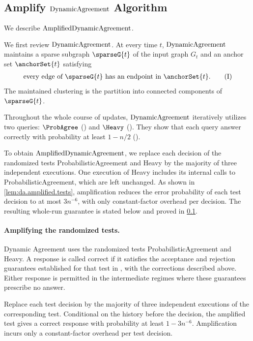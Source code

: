 \subsection{Amplify \texorpdfstring{$ \mathrm{DynamicAgreement} $}{DynamicAgreement} Algorithm}
\label{sub:amplify.da}
We describe $ \mathrm{AmplifiedDynamicAgreement} $.

We first review $ \mathrm{DynamicAgreement} $.
At every time $ t $, $ \mathrm{DynamicAgreement} $ maintains a sparse subgraph $ \sparseG{t} $ of the input graph $ G_t $ and an anchor set $ \anchorSet{t} $ satisfying
\begin{align}
    \text{every edge of } \sparseG{t} \text{ has an endpoint in } \anchorSet{t}. \tag{I} \label{eq:invariant.anchor}
\end{align}
The maintained clustering is the partition into connected components of $ \sparseG{t} $.

Throughout the whole course of updates, $ \mathrm{DynamicAgreement} $ iteratively utilizes two queries: $ \ProbAgree$ (\cite[Algorithm 8]{CLMP2024Dynamic}) and $ \Heavy $ (\cite[Algorithm 9]{CLMP2024Dynamic}).
They show that each query answer correctly with probability at least $ 1-n/2 $ (\cite[Lemma 49, Lemma 50, Lemma 52, Lemma 53]{CLMP2024Dynamic}).

To obtain $ \mathrm{AmplifiedDynamicAgreement} $, we replace each decision of the randomized tests ProbabilisticAgreement and Heavy by the majority of three independent executions.
One execution of Heavy includes its internal calls to ProbabilisticAgreement, which are left unchanged.
As shown in \cref{lem:da.amplified.tests}, amplification reduces the error probability of each test decision to at most $ 3n^{-6} $, with only constant-factor overhead per decision.
The resulting whole-run guarantee is stated below and proved in \cref{sub:amplify.da}.

\paragraph{Amplifying the randomized tests.}
Dynamic Agreement uses the randomized tests ProbabilisticAgreement and Heavy.
A response is called correct if it satisfies the acceptance and rejection guarantees established for that test in \cite[Appendix~E]{CLMP2024Dynamic}, with the corrections described above.
Either response is permitted in the intermediate regimes where these guarantees prescribe no answer.

\begin{lemma}
    \label{lem:da.amplified.tests}
    Replace each test decision by the majority of three independent executions of the corresponding test.
    Conditional on the history before the decision, the amplified test gives a correct response with probability at least $ 1-3n^{-6} $.
    Amplification incurs only a constant-factor overhead per test decision.
\end{lemma}

